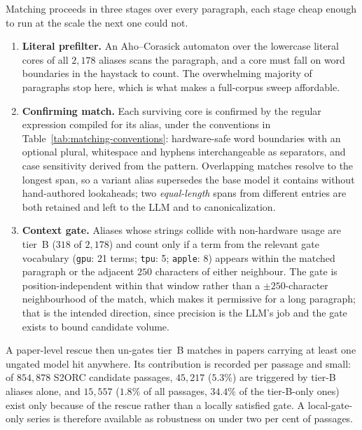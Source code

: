 Matching proceeds in three stages over every paragraph, each stage cheap enough to
run at the scale the next one could not.

\begin{enumerate}
\item \textbf{Literal prefilter.} An Aho--Corasick automaton over the lowercase
literal cores of all $2{,}178$ aliases scans the paragraph, and a core must fall on
word boundaries in the haystack to count. The overwhelming majority of paragraphs
stop here, which is what makes a full-corpus sweep affordable.

\item \textbf{Confirming match.} Each surviving core is confirmed by the regular
expression compiled for its alias, under the conventions in
Table~\ref{tab:matching-conventions}: hardware-safe word boundaries with an
optional plural, whitespace and hyphens interchangeable as separators, and case
sensitivity derived from the pattern. Overlapping matches resolve to the longest
span, so a variant alias supersedes the base model it contains without
hand-authored lookaheads; two \emph{equal-length} spans from different entries are
both retained and left to the LLM and to canonicalization.

\item \textbf{Context gate.} Aliases whose strings collide with non-hardware usage
are tier~B ($318$ of $2{,}178$) and count only if a term from the relevant gate
vocabulary (\texttt{gpu}: 21 terms; \texttt{tpu}: 5; \texttt{apple}: 8) appears
within the matched paragraph or the adjacent $250$ characters of either neighbour.
The gate is position-independent within that window rather than a
$\pm250$-character neighbourhood of the match, which makes it permissive for a long
paragraph; that is the intended direction, since precision is the LLM's job and the
gate exists to bound candidate volume.
\end{enumerate}


A paper-level rescue then un-gates tier~B matches in papers carrying at least one
ungated model hit anywhere. Its contribution is recorded per passage and small: of
$854{,}878$ S2ORC candidate passages, $45{,}217$ ($5.3\%$) are triggered by tier-B
aliases alone, and $15{,}557$ ($1.8\%$ of all passages, $34.4\%$ of the tier-B-only
ones) exist only because of the rescue rather than a locally satisfied gate. A
local-gate-only series is therefore available as robustness on under two per cent
of passages.


